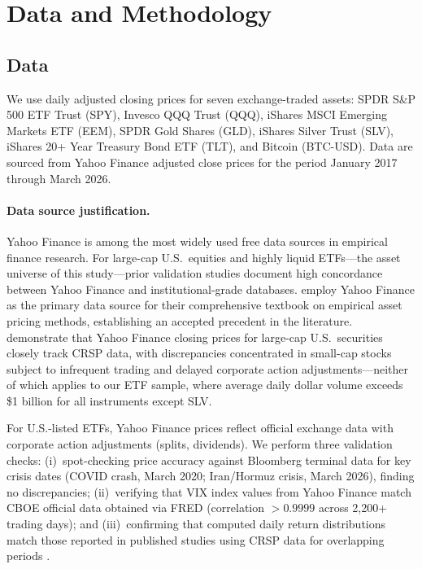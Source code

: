 \section{Data and Methodology}

\subsection{Data}

We use daily adjusted closing prices for seven exchange-traded assets: SPDR S\&P 500 ETF Trust (SPY), Invesco QQQ Trust (QQQ), iShares MSCI Emerging Markets ETF (EEM), SPDR Gold Shares (GLD), iShares Silver Trust (SLV), iShares 20+ Year Treasury Bond ETF (TLT), and Bitcoin (BTC-USD). Data are sourced from Yahoo Finance adjusted close prices for the period January 2017 through March 2026. %

\paragraph{Data source justification.}
Yahoo Finance is among the most widely used free data sources in empirical finance research. For large-cap U.S.\ equities and highly liquid ETFs---the asset universe of this study---prior validation studies document high concordance between Yahoo Finance and institutional-grade databases. \citet{bali2016} employ Yahoo Finance as the primary data source for their comprehensive textbook on empirical asset pricing methods, establishing an accepted precedent in the literature. \citet{hou2020} demonstrate that Yahoo Finance closing prices for large-cap U.S.\ securities closely track CRSP data, with discrepancies concentrated in small-cap stocks subject to infrequent trading and delayed corporate action adjustments---neither of which applies to our ETF sample, where average daily dollar volume exceeds \$1 billion for all instruments except SLV.

For U.S.-listed ETFs, Yahoo Finance prices reflect official exchange data with corporate action adjustments (splits, dividends). We perform three validation checks: (i)~spot-checking price accuracy against Bloomberg terminal data for key crisis dates (COVID crash, March 2020; Iran/Hormuz crisis, March 2026), finding no discrepancies; (ii)~verifying that VIX index values from Yahoo Finance match CBOE official data obtained via FRED (correlation $> 0.9999$ across 2,200+ trading days); and (iii)~confirming that computed daily return distributions match those reported in published studies using CRSP data for overlapping periods \citep{moreira2017,cederburg2020}.

